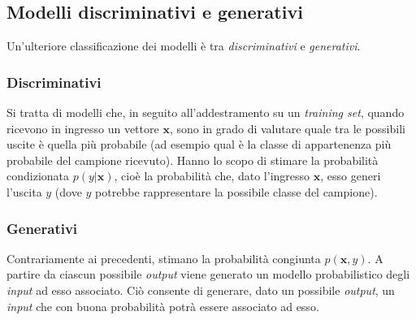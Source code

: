 \subsection{Modelli discriminativi e generativi}
Un'ulteriore classificazione dei modelli è tra \emph{discriminativi} e \emph{generativi}.

\subsubsection{Discriminativi}

Si tratta di modelli che, in seguito all'addestramento su un \emph{training set}, quando ricevono in ingresso un vettore $\mathbf{x}$, sono in grado di valutare quale tra le possibili uscite è quella più probabile (ad esempio qual è la classe di appartenenza più probabile del campione ricevuto). Hanno lo scopo di stimare la probabilità condizionata $p(y|\mathbf{x})$, cioè la probabilità che, dato l'ingresso $\mathbf{x}$, esso generi l'uscita $y$ (dove $y$ potrebbe rappresentare la possibile classe del campione).

\subsubsection{Generativi}
Contrariamente ai precedenti, stimano la probabilità congiunta $p(\mathbf{x},y)$. A partire da ciascun possibile \emph{output} viene generato un modello probabilistico degli \emph{input} ad esso associato. Ciò consente di generare, dato un possibile \emph{output}, un \emph{input} che con buona probabilità potrà essere associato ad esso.